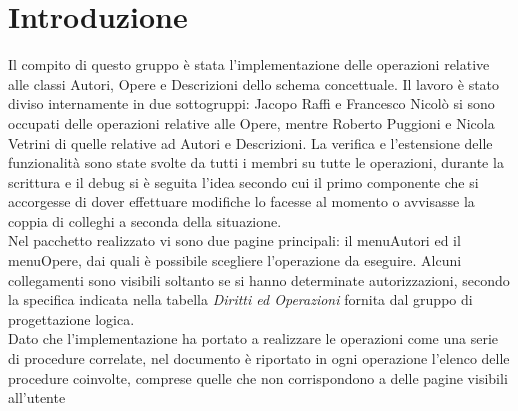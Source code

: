 \documentclass[a4paper,11pt]{article}
\begin{document}
\section{Introduzione}
Il compito di questo gruppo è stata l'implementazione delle operazioni relative alle classi Autori, Opere e Descrizioni dello schema concettuale. Il lavoro è stato diviso internamente in due sottogruppi: Jacopo Raffi e Francesco Nicolò si sono occupati delle operazioni relative alle Opere, mentre Roberto Puggioni e Nicola Vetrini di quelle relative ad Autori e Descrizioni. La verifica e l'estensione delle funzionalità sono state svolte da tutti i membri su tutte le operazioni, durante la scrittura e il debug si è seguita l'idea secondo cui il primo componente che si accorgesse di dover effettuare modifiche lo facesse al momento o avvisasse la coppia di colleghi a seconda della situazione.\\
Nel pacchetto realizzato vi sono due pagine principali: il menuAutori ed il menuOpere, dai
quali è possibile scegliere l'operazione da eseguire. Alcuni collegamenti sono visibili soltanto se si hanno determinate autorizzazioni, secondo la specifica indicata nella tabella \textit{Diritti ed Operazioni} fornita dal gruppo di progettazione logica.\\
Dato che l'implementazione ha portato a realizzare le operazioni come una serie di procedure correlate, nel documento è riportato in ogni operazione l'elenco delle procedure
coinvolte, comprese quelle che non corrispondono a delle pagine visibili all'utente


\clearpage


\clearpage


\end{document}
